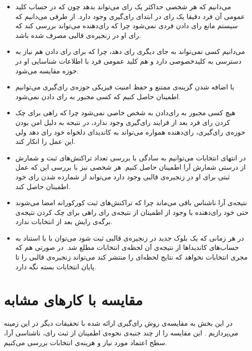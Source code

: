 \begin{itemize}
	\item 
	می‌دانیم که هر شخصی حداکثر یک رای‌ می‌تواند بدهد چون که در حساب کلید عمومی آن فرد دقیقا یک رای در ابتدای رای‌گیری وجود دارد. از طرفی می‌دانیم که سیستم مانع رای دادن فردی نمی‌شود چرا که رای‌دهنده می‌تواند بررسی کند که رای‌ او در زنجیره‌ی قالبی مصرف شده باشد.
	\item 
	می‌دانیم کسی نمی‌تواند به جای دیگری رای دهد، چرا که برای رای دادن هم نیاز به دسترسی به کلیدخصوصی دارد و هم کلید عمومی فرد با اطلاعات شناسایی او در حوزه مقایسه می‌شود.
	\item 
	با اضافه شدن گزینه‌ی ممتنع و حفظ امنیت فیزیکی حوزه‌ی رای‌گیری می‌توانیم اطمینان حاصل کنیم که کسی مجبور به رای‌ دادن نمی‌شود.
	\item 
 هیچ کسی مجبور به رای‌دادن به شخص خاصی نمی‌شود چرا که راهی برای چک کردن رای‌ فرد بعد از فرایند رای‌گیری وجود ندارد، در نتیجه به دلیل امن بودن حوزه‌ی رای‌گیری، رای‌دهنده همواره می‌تواند به کاندیدای دلخواه خود رای‌ دهد ولی این عمل را انکار کند.
	\item 
	در انتهای انتخابات می‌توانیم به سادگی با بررسی تعداد تراکنش‌های ثبت و شمارش از درستی شمارش آرا اطمینان حاصل کنیم. هر شخصی نیز با بررسی این که عمل ثبتی برای او در زنجیره‌ی قالبی وجود دارد می‌تواند از شمارده شدن رای خود اطمینان حاصل کند.
	\item 
	نتیجه‌ی آرا ناشناس  باقی می‌ماند چرا که تراکنش‌های ثبت کورکورانه امضا می‌شوند حتی خود رای‌دهنده با وجود از اطمینان از نتیجه‌ی رای راهی برای چک کردن نتیجه‌ی برگه‌ی رایش بعد از انتخابات ندارد.
	\item 
	در هر زمانی که یک بلوک جدید در زنجیره‌ی قالبی ثبت شود می‌توان با با استناد به حساب‌های کاندیداها از نتیجه‌ی آن لحظه‌ی انتخابات مطلع شد. در صورتی هم که مجری انتخابات نخواهد که نتایج لحظه‌ای را منتشر کند می‌تواند زنجیره‌ی قالبی را تا پایان انتخابات بسته نگه دارد. 
\end{itemize}




\section{مقایسه با کارهای مشابه}
در این بخش به مقایسه‌‌ی روش رای‌گیری ارائه شده با تحقیقات دیگر در این زمینه می‌پردازیم . این مقایسه را از چند جنبه‌ی نحوه‌ی اطمینان از ثبت رای، ناشناسی آرا،  سطح اعتماد مورد نیاز و  هزینه‌ی انتخابات بررسی می‌کنیم. 
